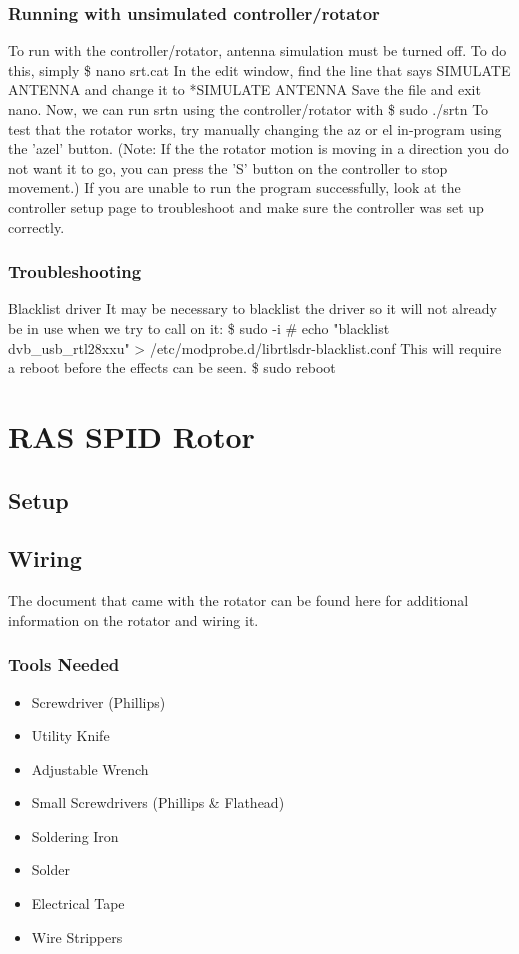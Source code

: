 \documentclass[11pt]{article} %
\begin{document}
\subsubsection{Running with unsimulated controller/rotator}
To run with the controller/rotator, antenna simulation must be turned off. To do this, simply
\$ nano srt.cat
In the edit window, find the line that says
SIMULATE ANTENNA
and change it to
*SIMULATE ANTENNA
Save the file and exit nano. Now, we can run srtn using the controller/rotator with
\$ sudo ./srtn
To test that the rotator works, try manually changing the az or el in-program using the 'azel' button. (Note: If the the rotator motion is moving in a direction you do not want it to go, you can press the 'S' button on the controller to stop movement.)
If you are unable to run the program successfully, look at the controller setup page to troubleshoot and make sure the controller was set up correctly.

\subsubsection{Troubleshooting}
Blacklist driver
It may be necessary to blacklist the driver so it will not already be in use when we try to call on it:
\$ sudo -i
\# echo "blacklist dvb\_usb\_rtl28xxu" > /etc/modprobe.d/librtlsdr-blacklist.conf
This will require a reboot before the effects can be seen.
\$ sudo reboot


\newpage
\section{RAS SPID Rotor}

\subsection{Setup}



\subsection{Wiring}


The document that came with the rotator can be found here for additional information on the rotator and wiring it.

\subsubsection{Tools Needed}
\begin{itemize}
\item Screwdriver (Phillips)
\item Utility Knife
\item Adjustable Wrench
\item Small Screwdrivers (Phillips \& Flathead)
\item Soldering Iron
\item Solder
\item Electrical Tape
\item Wire Strippers
\end{itemize}
\end{document}
